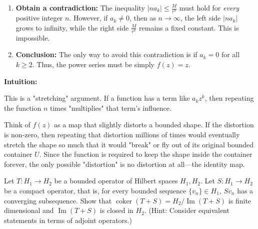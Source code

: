 \begin{solution}
\begin{enumerate}
    \item \textbf{Obtain a contradiction:} The inequality $|n a_k| \leq \frac{M}{r^k}$ must hold for \textit{every} positive integer $n$. 
    However, if $a_k \neq 0$, then as $n \to \infty$, the left side $|n a_k|$ grows to infinity, while the right side $\frac{M}{r^k}$ remains a fixed constant. This is impossible.

    \item \textbf{Conclusion:} The only way to avoid this contradiction is if $a_k = 0$ for all $k \geq 2$. Thus, the power series must be simply $f(z) = z$.
\end{enumerate}
\par\medskip
\textbf{Intuition:}
\par\medskip
This is a "stretching" argument. If a function has a term like $a_k z^k$, then repeating the function $n$ times "multiplies" that term's influence. 
\par\medskip
Think of $f(z)$ as a map that slightly distorts a bounded shape. If the distortion is non-zero, then repeating that distortion millions of times would eventually stretch the shape so much that it would "break" or fly out of its original bounded container $U$. Since the function is required to keep the shape inside the container forever, the only possible "distortion" is no distortion at all—the identity map.
\end{solution}

\begin{exercise}
\label{analysis:2015:11}
Let $T:H_1\to H_2$ be a bounded operator of Hilbert spaces $H_1,H_2$. Let $S:H_1\to H_2$ be a compact operator, that is, for every bounded sequence $\{v_n\}\in H_1$, $Sv_n$ has a converging subsequence. Show that $\operatorname{coker}(T+S) = H_2/\operatorname{Im}(T+S)$ is finite dimensional and $\operatorname{Im}(T+S)$ is closed in $H_2$. (Hint: Consider equivalent statements in terms of adjoint operators.)
\end{exercise}

